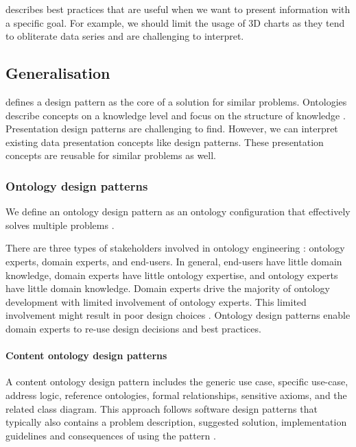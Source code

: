 \cite{BI09} describes best practices that are useful when we want to present information with a specific goal. For example, we should limit the usage of 3D charts as they tend to obliterate data series and are challenging to interpret. 

\subsection{Generalisation}
\cite{BK03} defines a design pattern as the core of a solution for similar problems. Ontologies describe concepts on a knowledge level and focus on the structure of knowledge \parencite{SM19}. Presentation design patterns are challenging to find. However, we can interpret existing data presentation concepts like design patterns. These presentation concepts are reusable for similar problems as well.

\subsubsection{Ontology design patterns} \label{tf_odp}
\newcommand{\tfodp}{We define an ontology design pattern as an ontology configuration that effectively solves multiple problems \parencite{ODP06}.}

\tfodp

There are three types of stakeholders involved in ontology engineering \parencite{ODP02}: ontology experts, domain experts, and end-users. In general, end-users have little domain knowledge, domain experts have little ontology expertise, and ontology experts have little domain knowledge. Domain experts drive the majority of ontology development with limited involvement of ontology experts. This limited involvement might result in poor design choices \parencite{ODP02}. Ontology design patterns enable domain experts to re-use design decisions and best practices. 

\paragraph{Content ontology design patterns} \label{CODP}
A content ontology design pattern includes the generic use case, specific use-case, address logic, reference ontologies, formal relationships, sensitive axioms, and the related class diagram. This approach follows software design patterns that typically also contains a problem description, suggested solution, implementation guidelines and consequences of using the pattern \parencite{ODP07}.

